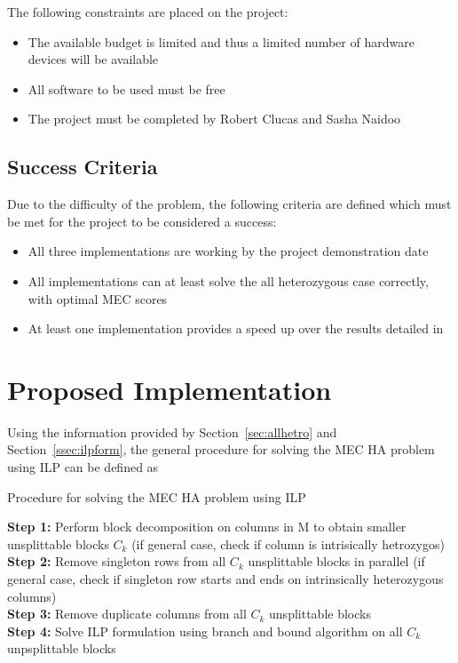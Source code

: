 \documentclass[10pt,a4paer,twocolumn]{article}
\begin{document}
The following constraints are placed on the project:
\begin{itemize}[noitemsep]
    \item{The available budget is limited and thus a limited number of hardware devices will be available}
    \item{All software to be used must be free}
    \item{The project must be completed by Robert Clucas and Sasha Naidoo}
\end{itemize}

\subsection{Success Criteria}

Due to the difficulty of the problem, the following criteria are defined which must be met for the project to
be considered a success:
\begin{itemize}[noitemsep]
    \item{All three implementations are working by the project demonstration date}
    \item{All implementations can at least solve the all heterozygous case correctly, with optimal MEC scores}
    \item{At least one implementation provides a speed up over the results detailed in \cite{chen:2013} }
\end{itemize}


\section{Proposed Implementation}

Using the information provided by Section~\ref{sec:allhetro} and Section~\ref{ssec:ilpform}, the general
procedure for solving the MEC HA problem using ILP can be defined as
\begin{algorithm}[t*]
    \small
    \caption{Procedure for solving the MEC HA problem using ILP}
    \label{alg:proc}
\textbf{Step 1:} Perform block decomposition on columns in M to obtain smaller unsplittable blocks $C_k$ (if 
general case, check if column is intrisically hetrozygos)                                                       \\
\textbf{Step 2:} Remove singleton rows from all $C_k$ unsplittable blocks in parallel (if general case, check 
if singleton row starts and ends on intrinsically heterozygous columns)                                          \\
\textbf{Step 3:} Remove duplicate columns from all $C_k$ unsplittable blocks 							        \\
\textbf{Step 4:} Solve ILP formulation using branch and bound algorithm on all $C_k$ unpsplittable blocks 
\end{algorithm}
\end{document}
